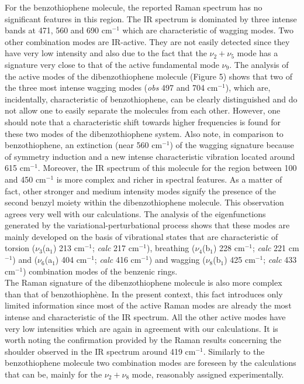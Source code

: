 	
	For the benzothiophene molecule, the reported Raman spectrum has no significant features in this region. The IR spectrum is dominated by three intense bands at 471, 560 and 690 cm$^{-1}$ which are characteristic of wagging modes. Two other combination modes are IR-active. They are not easily detected since they have very low intensity and also due to the fact that the $\nu_{2}+ \nu_{5}$ mode has a signature very close to that of the active fundamental mode $\nu_{9}$. The analysis of the active modes of the dibenzothiophene molecule (Figure 5) shows that two of the three most intense wagging modes (\textit{obs} 497 and 704 cm$^{-1}$), which are, incidentally, characteristic of benzothiophene, can be clearly distinguished and do not allow one to easily separate the molecules from each other. However, one should note that a characteristic shift towards higher frequencies is found for these two modes of the dibenzothiophene system. Also note, in comparison to benzothiophene, an extinction (near 560 cm$^{-1}$) of the wagging signature because of symmetry induction and a new intense characteristic vibration located around 615 cm$^{-1}$. Moreover, the IR spectrum of this molecule for the region between 100 and 450 cm$^{-1}$ is more complex and richer in spectral features. As a matter of fact, other stronger and medium intensity modes signify the presence of the second benzyl moiety within the dibenzothiophene molecule. This observation agrees very well with our calculations. The analysis of the eigenfunctions generated by the variational-perturbational process shows that these modes are mainly developed on the basis of vibrational states that are characteristic of torsion ($\nu_{3}$(a$_{1}$) 213 cm$^{-1}$; \textit{calc} 217 cm$^{-1}$), breathing ($\nu_{4}$(b$_{1}$) 228 cm$^{-1}$; \textit{calc} 221 cm$^{-1}$) and ($\nu_{6}$(a$_{1}$) 404 cm$^{-1}$; \textit{calc} 416 cm$^{-1}$) and wagging ($\nu_{8}$(b$_{1}$) 425 cm$^{-1}$; \textit{calc} 433 cm$^{-1}$) combination modes of the benzenic rings. \\
	
	The Raman signature of the dibenzothiophene molecule is also more complex than that of benzothiophène. In the present context, this fact introduces only limited information since most of the active Raman modes are already the most intense and characteristic of the IR spectrum. All the other active modes have very low intensities which are again in agreement with our calculations. It is worth noting the confirmation provided by the Raman results concerning the shoulder observed in the IR spectrum around 419 cm$^{-1}$. 
	Similarly to the benzothiophene molecule two combination modes are foreseen by the calculations that can be, mainly for the $\nu_{2}+\nu_{8}$ mode, reasonably assigned experimentally.\\
	
